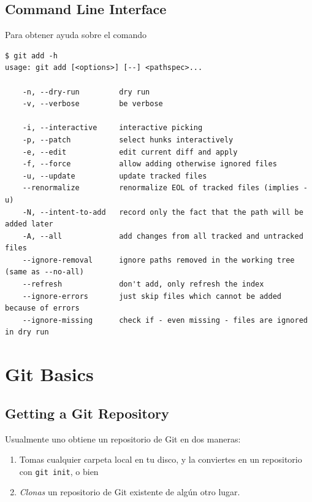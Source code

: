 \documentclass[spanish, 12pt, a4paper]{article}
\begin{document}
\subsection{Command Line Interface}

Para obtener ayuda sobre el comando

\begin{lstlisting}
$ git add -h
usage: git add [<options>] [--] <pathspec>...

    -n, --dry-run         dry run
    -v, --verbose         be verbose

    -i, --interactive     interactive picking
    -p, --patch           select hunks interactively
    -e, --edit            edit current diff and apply
    -f, --force           allow adding otherwise ignored files
    -u, --update          update tracked files
    --renormalize         renormalize EOL of tracked files (implies -u)
    -N, --intent-to-add   record only the fact that the path will be added later
    -A, --all             add changes from all tracked and untracked files
    --ignore-removal      ignore paths removed in the working tree (same as --no-all)
    --refresh             don't add, only refresh the index
    --ignore-errors       just skip files which cannot be added because of errors
    --ignore-missing      check if - even missing - files are ignored in dry run
\end{lstlisting}

\section{Git Basics}

\subsection{Getting a Git Repository}

Usualmente uno obtiene un repositorio de Git en dos maneras:

\begin{enumerate}
\item
  Tomas cualquier carpeta local en tu disco, y la conviertes en un
  repositorio con \texttt{git\ init}, o bien
\item
  \emph{Clonas} un repositorio de Git existente de algún otro lugar.
\end{enumerate}
\end{document}
